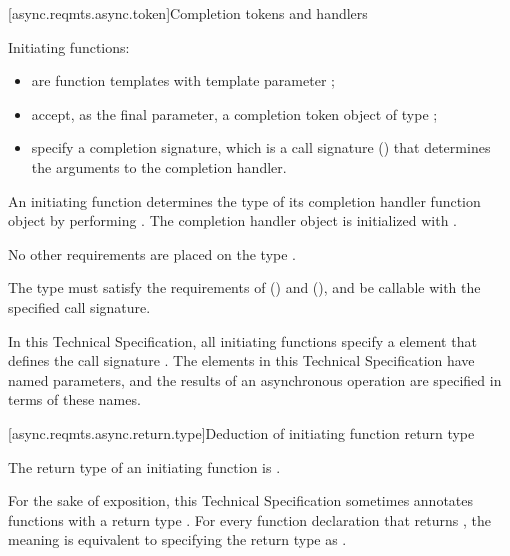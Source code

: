 [async.reqmts.async.token]{Completion tokens and handlers}

\pnum
 Initiating functions:

\begin{itemize}
\item
are function templates with template parameter ;

\item
accept, as the final parameter, a completion token object  of type ;

\item
specify a completion signature, which is a call signature ()  that determines the arguments to the completion handler.
\end{itemize}

\pnum
An initiating function determines the type  of its
completion handler function object by performing
.
The completion handler object  is initialized with
.
\begin{note} No other requirements are placed on the type . \end{note}

\pnum
The type  must satisfy the requirements of  () and  (), and be callable with the specified call signature.

\pnum
In this Technical Specification, all initiating functions specify a
\completionsig element that defines the call signature .
The \completionsig elements in this Technical Specification have named
parameters, and the results of an asynchronous operation are specified in
terms of these names.



[async.reqmts.async.return.type]{Deduction of initiating function return type}

\pnum
The return type of an initiating function is .

\pnum
For the sake of exposition, this Technical Specification sometimes annotates functions with a return type \DEDUCED. For every function declaration that returns \DEDUCED, the meaning is equivalent to specifying the return type as .



